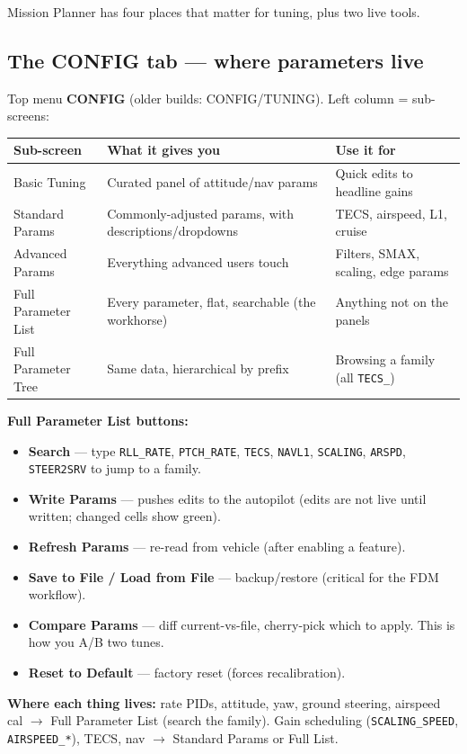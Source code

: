 \documentclass[11pt,a4paper]{article}
\newcommand{\pp}[1]{\texttt{#1}} %
\begin{document}
Mission Planner has four places that matter for tuning, plus two live tools.

\subsection{The CONFIG tab --- where parameters live}
Top menu \textbf{CONFIG} (older builds: CONFIG/TUNING). Left column = sub-screens:

\begin{longtable}{@{}p{3.4cm}p{6.6cm}p{4.4cm}@{}}
\toprule
\textbf{Sub-screen} & \textbf{What it gives you} & \textbf{Use it for}\\
\midrule
\endhead
Basic Tuning & Curated panel of attitude/nav params & Quick edits to headline gains\\
Standard Params & Commonly-adjusted params, with descriptions/dropdowns & TECS, airspeed, L1, cruise\\
Advanced Params & Everything advanced users touch & Filters, SMAX, scaling, edge params\\
Full Parameter List & Every parameter, flat, searchable (the workhorse) & Anything not on the panels\\
Full Parameter Tree & Same data, hierarchical by prefix & Browsing a family (all \pp{TECS\_})\\
\bottomrule
\end{longtable}

\textbf{Full Parameter List buttons:}
\begin{itemize}[leftmargin=1.4em]
  \item \textbf{Search} --- type \pp{RLL\_RATE}, \pp{PTCH\_RATE}, \pp{TECS},
  \pp{NAVL1}, \pp{SCALING}, \pp{ARSPD}, \pp{STEER2SRV} to jump to a family.
  \item \textbf{Write Params} --- pushes edits to the autopilot (edits are not live
  until written; changed cells show green).
  \item \textbf{Refresh Params} --- re-read from vehicle (after enabling a feature).
  \item \textbf{Save to File / Load from File} --- backup/restore (critical for the
  FDM workflow).
  \item \textbf{Compare Params} --- diff current-vs-file, cherry-pick which to
  apply. This is how you A/B two tunes.
  \item \textbf{Reset to Default} --- factory reset (forces recalibration).
\end{itemize}

\textbf{Where each thing lives:} rate PIDs, attitude, yaw, ground steering,
airspeed cal $\rightarrow$ Full Parameter List (search the family). Gain
scheduling (\pp{SCALING\_SPEED}, \pp{AIRSPEED\_*}), TECS, nav $\rightarrow$
Standard Params or Full List.
\end{document}

